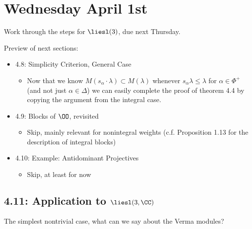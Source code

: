 \hypertarget{wednesday-april-1st}{%
\section{Wednesday April 1st}\label{wednesday-april-1st}}

\begin{description}
\tightlist
\item[Exercise]
Work through the steps for \(\liesl(3)\), due next Thursday.
\end{description}

Preview of next sections:

\begin{itemize}
\tightlist
\item
  4.8: Simplicity Criterion, General Case

  \begin{itemize}
  \tightlist
  \item
    Now that we know \(M(s_\alpha \cdot \lambda) \subset M(\lambda)\)
    whenever \(s_\alpha \lambda \leq \lambda\) for \(\alpha \in \Phi^+\)
    (and not just \(\alpha \in \Delta\)) we can easily complete the
    proof of theorem 4.4 by copying the argument from the integral case.
  \end{itemize}
\item
  4.9: Blocks of \(\OO\), revisited

  \begin{itemize}
  \tightlist
  \item
    Skip, mainly relevant for nonintegral weights (c.f. Proposition 1.13
    for the description of integral blocks)
  \end{itemize}
\item
  4.10: Example: Antidominant Projectives

  \begin{itemize}
  \tightlist
  \item
    Skip, at least for now
  \end{itemize}
\end{itemize}

\hypertarget{application-to-liesl3-cc}{%
\subsection{\texorpdfstring{4.11: Application to
\(\liesl(3, \CC)\)}{4.11: Application to \textbackslash liesl(3, \textbackslash CC)}}\label{application-to-liesl3-cc}}

The simplest nontrivial case, what can we say about the Verma modules?

